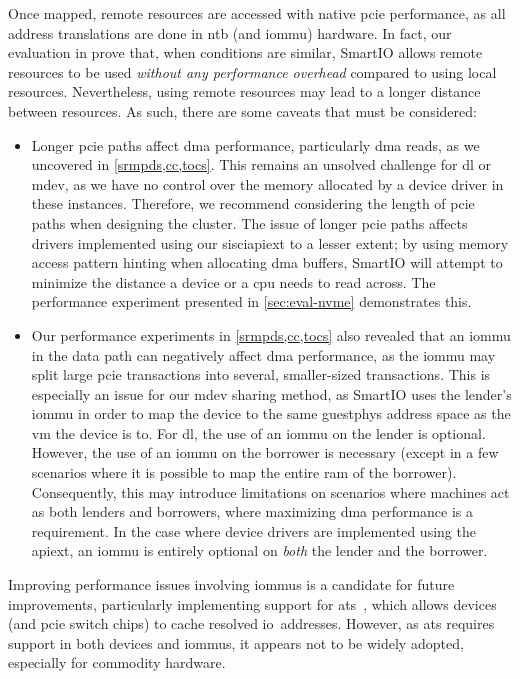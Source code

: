 Once mapped, remote resources are accessed with native \gls{pcie} performance, as all address translations are done in \gls{ntb} (and \gls{iommu}) hardware.
%
In fact, our evaluation in  prove that, when conditions are similar, SmartIO allows remote resources to be used \emph{without any performance overhead} compared to using local resources.
%
Nevertheless, using remote resources may lead to a longer distance between resources.
%
As such, there are some caveats that must be considered:
%
\begin{itemize}
    \item Longer \gls{pcie} paths affect \gls{dma} performance, particularly \gls{dma} reads, as we uncovered in \cref{srmpds,cc,tocs}.
        This remains an unsolved challenge for \gls{dl} or \gls{mdev}, as we have no control over the memory allocated by a device driver in these instances.
        Therefore, we recommend considering the length of \gls{pcie} paths when designing the cluster.
        The issue of longer \gls{pcie} paths affects drivers implemented using our \gls{sisciapiext} to a lesser extent;
        by using memory access pattern hinting when allocating \gls{dma} buffers, SmartIO will attempt to minimize the distance a device or a \gls{cpu} needs to read across.
        The performance experiment presented in \cref{sec:eval-nvme} demonstrates this.


    \item Our performance experiments in \cref{srmpds,cc,tocs} also revealed that an \gls{iommu} in the data path can negatively affect \gls{dma} performance, as the \gls{iommu} may split large \gls{pcie} transactions into several, smaller-sized transactions.
        This is especially an issue for our \gls{mdev} sharing method, as SmartIO uses the \gls{lender}'s \gls{iommu} in order to map the device to the same \gls{guestphys} address space as the \gls{vm} the device is  to.
        For \gls{dl}, the use of an \gls{iommu} on the \gls{lender} is optional.
        However, the use of an \gls{iommu} on the \gls{borrower} is necessary (except in a few scenarios where it is possible to map the entire \gls{ram} of the \gls{borrower}). 
        Consequently, this may introduce limitations on scenarios where machines act as both \glspl{lender} and \glspl{borrower}, where maximizing \gls{dma} performance is a requirement.
        In the case where device drivers are implemented using the \gls{apiext}, an \gls{iommu} is entirely optional on \emph{both} the \gls{lender} and the \gls{borrower}.
\end{itemize}
%
Improving performance issues involving \glspl{iommu} is a candidate for future improvements, particularly implementing support for \gls{ats}~\cite{spec:ATS}, which allows devices (and \gls{pcie} switch chips) to cache resolved \gls{io}~addresses.
%
However, as \gls{ats} requires support in both devices and \glspl{iommu}, it appears not to be widely adopted, especially for commodity hardware.



